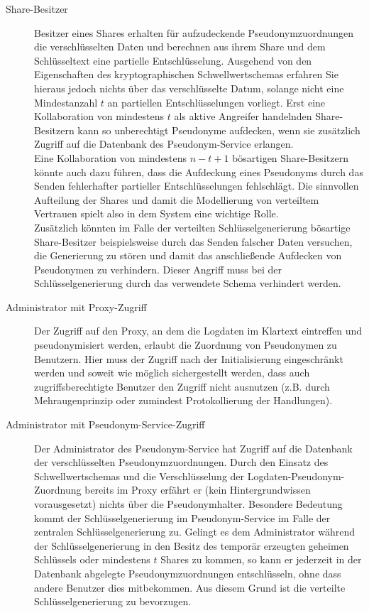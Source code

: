 \begin{description}
  \item[Share-Besitzer] Besitzer eines Shares erhalten für aufzudeckende Pseudonymzuordnungen die verschlüsselten Daten und berechnen aus ihrem Share und dem Schlüsseltext eine partielle Entschlüsselung. Ausgehend von den Eigenschaften des kryptographischen Schwellwertschemas erfahren Sie hieraus jedoch nichts über das verschlüsselte Datum, solange nicht eine Mindestanzahl \(t\) an partiellen Entschlüsselungen vorliegt. Erst eine Kollaboration von mindestens \(t\) als aktive Angreifer handelnden Share-Besitzern kann so unberechtigt Pseudonyme aufdecken, wenn sie zusätzlich Zugriff auf die Datenbank des Pseudonym-Service erlangen. \\
  Eine Kollaboration von mindestens \(n-t+1\) bösartigen Share-Besitzern könnte auch dazu führen, dass die Aufdeckung eines Pseudonyms durch das Senden fehlerhafter partieller Entschlüsselungen fehlschlägt. Die sinnvollen Aufteilung der Shares und damit die Modellierung von verteiltem Vertrauen spielt also in dem System eine wichtige Rolle.\\
  Zusätzlich könnten im Falle der verteilten Schlüsselgenerierung bösartige Share-Besitzer beispielsweise durch das Senden falscher Daten versuchen, die Generierung zu stören und damit das anschließende Aufdecken von Pseudonymen zu verhindern. Dieser Angriff muss bei der Schlüsselgenerierung durch das verwendete Schema verhindert werden.
  
  \item[Administrator mit Proxy-Zugriff] Der Zugriff auf den Proxy, an dem die Logdaten im Klartext eintreffen und pseudonymisiert werden, erlaubt die Zuordnung von Pseudonymen zu Benutzern. Hier muss der Zugriff nach der Initialisierung eingeschränkt werden und soweit wie möglich sichergestellt werden, dass auch zugriffsberechtigte Benutzer den Zugriff nicht ausnutzen (z.B. durch Mehraugenprinzip oder zumindest Protokollierung der Handlungen).
  
  \item[Administrator mit Pseudonym-Service-Zugriff] Der Administrator des Pseudonym-Service hat Zugriff auf die Datenbank der verschlüsselten Pseudonymzuordnungen. Durch den Einsatz des Schwellwertschemas und die Verschlüsselung der Logdaten-Pseudonym-Zuordnung bereits im Proxy erfährt er (kein Hintergrundwissen vorausgesetzt) nichts über die Pseudonymhalter. Besondere Bedeutung kommt der Schlüsselgenerierung im Pseudonym-Service im Falle der zentralen Schlüsselgenerierung zu. Gelingt es dem Administrator während der Schlüsselgenerierung in den Besitz des temporär erzeugten geheimen Schlüssels oder mindestens \(t\) Shares zu kommen, so kann er jederzeit in der Datenbank abgelegte Pseudonymzuordnungen entschlüsseln, ohne dass andere Benutzer dies mitbekommen. Aus diesem Grund ist die verteilte Schlüsselgenerierung zu bevorzugen.
\end{description}